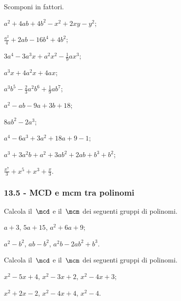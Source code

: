 \begin{esercizio}[\Ast]
 \label{ese:13.85}
 Scomponi in fattori.
\begin{multicols}{2}
 \begin{enumeratea}
\item $a^{2}+4{ab}+4b^{2}-x^{2}+2xy-y^{2}$;
\item $\frac{a^{2}}{4}+2{ab}-16b^{4}+4b^{2}$;
\item $3a^{4}-3a^{3}x+a^{2}x^{2}-\frac{1}{9}ax^{3}$;
\item $a^{3}x+4a^{2}x+4ax$;
\item $a^{3}b^{5}-\frac{2}{3}a^{2}b^{6}+\frac{1}{9}ab^{7}$;
\item $a^{2}-{ab}-9a+3b+18$;
\item $8{ab}^{2}-2a^{3}$;
\item $a^{4}-6a^{3}+3a^{2}+18a+9-1$;
\item $a^{3}+3a^{2}b+a^{2}+3{ab}^{2}+2{ab}+b^{3}+b^{2}$;
\item $\frac{x^{7}}{3}+x^{5}+x^{3}+\frac{x}{3}$.
 \end{enumeratea}
\end{multicols}
\end{esercizio}

\subsubsection*{13.5 - MCD e mcm tra polinomi}

\begin{esercizio}[\Ast]
\label{ese:13.86}
Calcola il~$\mcd$ e il~$\mcm$ dei seguenti gruppi di polinomi.
\begin{multicols}{2}
\begin{enumeratea}
 \item $a+3$, $5a+15$, $a^{2}+6a+9$;
 \item $a^{2}-b^{2}$, $ab-b^{2}$, $a^{2}b-2ab^{2}+b^{3}$.
\end{enumeratea}
\end{multicols}
\end{esercizio}

\begin{esercizio}[\Ast]
\label{ese:13.87}
Calcola il~$\mcd$ e il~$\mcm$ dei seguenti gruppi di polinomi.
\begin{multicols}{2}
\begin{enumeratea}
 \item $x^{2}-5x+4$, $x^{2}-3x+2$, $x^{2}-4x+3$;
 \item $x^{2}+2x-2$, $x^{2}-4x+4$, $x^{2}-4$.
\end{enumeratea}
\end{multicols}
\end{esercizio}

